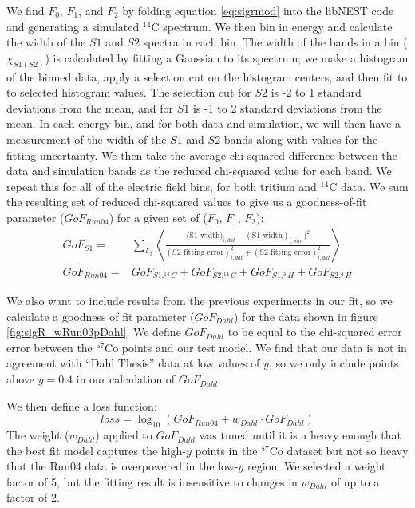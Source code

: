 We find $F_0$, $F_1$, and $F_2$ by folding equation \ref{eq:sigrmod} into the libNEST code and generating a simulated $^{14}$C spectrum. We then bin in energy and calculate the width of the $S1$ and $S2$ spectra in each bin. The width of the bands in a bin ($\chi_{S1(S2)}$) is calculated by fitting a Gaussian to its spectrum; we make a histogram of the binned data, apply a selection cut on the histogram centers, and then fit to to selected histogram values. The selection cut for $S2$ is -2 to 1 standard deviations from the mean, and for $S1$ is -1 to 2 standard deviations from the mean. In each energy bin, and for both data and simulation, we will then have a measurement of the width of the $S1$ and $S2$ bands along with values for the fitting uncertainty. We then take the average chi-squared difference between the data and simulation bands as the reduced chi-squared value for each band. We repeat this for all of the electric field bins, for both tritium and $^{14}$C data. We sum the resulting set of reduced chi-squared values to give us a goodness-of-fit parameter ($GoF_{Run04}$) for a given set of ($F_0$, $F_1$, $F_2$):
\begin{equation}
\begin{split}
GoF_{S1}=&\sum_{\mathcal{E}_i}\left\langle \frac{\bigg(\text{S1 width})_{i,dat}-(\text{S1 width})_{i,sim}\bigg)^2}{(\text{S2 fitting error})_{i,dat}^2+(\text{S2 fitting error})_{i,dat}^2}\right\rangle \\[1em]
GoF_{Run04}=&GoF_{S1,^{14}C}+GoF_{S2,^{14}C}+GoF_{S1,^3H}+GoF_{S2,^3H}
\end{split}
\end{equation}

We also want to include results from the previous experiments in our fit, so we calculate a goodness of fit parameter ($GoF_{Dahl}$) for the data shown in figure \ref{fig:sigR_wRun03pDahl}. We define $GoF_{Dahl}$ to be equal to the chi-squared error error between the $^{57}$Co points and our test model. We find that our data is not in agreement with ``Dahl Thesis'' data at low values of $y$, so we only include points above $y=0.4$ in our calculation of $GoF_{Dahl}$. 

We then define a loss function:
\begin{equation}
loss=\log_{10}(GoF_{Run04}+w_{Dahl}\cdot GoF_{Dahl})
\end{equation}
The weight ($w_{Dahl}$) applied to $GoF_{Dahl}$ was tuned until it is a heavy enough that the best fit model captures the high-$y$ points in the $^{57}$Co dataset but not so heavy that the Run04 data is overpowered in the low-$y$ region. We selected a weight factor of 5, but the fitting result is insensitive to changes in $w_{Dahl}$ of up to a factor of 2.

